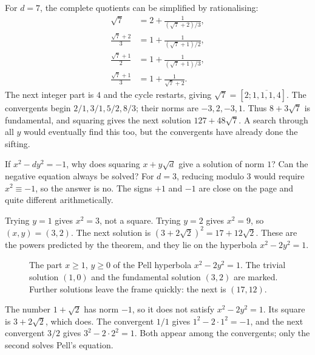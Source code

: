 For $d=7$, the complete quotients can be simplified by rationalising:
\[
\begin{aligned}
\sqrt7&=2+\frac1{(\sqrt7+2)/3},\\
\frac{\sqrt7+2}{3}&=1+\frac1{(\sqrt7+1)/2},\\
\frac{\sqrt7+1}{2}&=1+\frac1{(\sqrt7+1)/3},\\
\frac{\sqrt7+1}{3}&=1+\frac1{\sqrt7+2}.
\end{aligned}
\]
The next integer part is $4$ and the cycle restarts, giving $\sqrt7=[2;\overline{1,1,1,4}]$. The convergents begin $2/1,3/1,5/2,8/3$; their norms are $-3,2,-3,1$. Thus $8+3\sqrt7$ is fundamental, and squaring gives the next solution $127+48\sqrt7$. A search through all $y$ would eventually find this too, but the convergents have already done the sifting.

\begin{think}
If $x^2-dy^2=-1$, why does squaring $x+y\sqrt d$ give a solution of norm $1$? Can the negative equation always be solved? For $d=3$, reducing modulo $3$ would require $x^2\equiv-1$, so the answer is no. The signs $+1$ and $-1$ are close on the page and quite different arithmetically.
\end{think}

\begin{examplex}[the solution for $d=2$]
Trying $y=1$ gives $x^2=3$, not a square. Trying $y=2$ gives $x^2=9$, so $(x,y)=(3,2)$. The next solution is $(3+2\sqrt 2)^2=17+12\sqrt 2$. These are the powers predicted by the theorem, and they lie on the hyperbola $x^2-2y^2=1$.
\end{examplex}

\begin{figure}[ht]
\centering
{}
\caption{The part $x\ge1$, $y\ge0$ of the Pell hyperbola $x^2-2y^2=1$. The trivial solution $(1,0)$ and the fundamental solution $(3,2)$ are marked. Further solutions leave the frame quickly: the next is $(17,12)$.}
\label{fig:t1-pell}
\end{figure}

\begin{examplex}
The number $1+\sqrt 2$ has norm $-1$, so it does not satisfy $x^2-2y^2=1$. Its square is $3+2\sqrt 2$, which does. The convergent $1/1$ gives $1^2-2\cdot 1^2=-1$, and the next convergent $3/2$ gives $3^2-2\cdot 2^2=1$. Both appear among the convergents; only the second solves Pell's equation.
\end{examplex}

